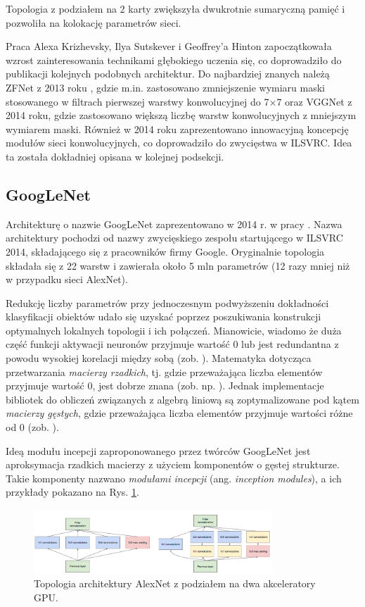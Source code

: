 Topologia z podziałem na 2 karty zwiększyła dwukrotnie sumaryczną pamięć i pozwoliła na kolokację parametrów sieci.

Praca Alexa Krizhevsky, Ilya Sutskever i Geoffrey'a Hinton zapoczątkowała wzrost zainteresowania technikami głębokiego uczenia się, co doprowadziło do publikacji kolejnych podobnych architektur. Do najbardziej znanych należą ZFNet z 2013 roku \cite{ZFNet}, gdzie m.in. zastosowano zmniejszenie wymiaru maski stosowanego w filtrach pierwszej warstwy konwolucyjnej do 7$\times$7 oraz VGGNet \cite{VGGNet} z 2014 roku, gdzie zastosowano większą liczbę warstw konwolucyjnych z mniejszym wymiarem maski. Również w 2014 roku zaprezentowano innowacyjną koncepcję modułów sieci konwolucyjnych, co doprowadziło do zwycięstwa w ILSVRC. Idea ta została dokładniej opisana w kolejnej podsekcji.

\subsection{GoogLeNet}

Architekturę o nazwie GoogLeNet zaprezentowano w 2014 r. w pracy \cite{GoogleNet}. Nazwa architektury pochodzi od nazwy zwycięskiego zespołu startującego w ILSVRC 2014, składającego się z pracowników firmy Google. Oryginalnie topologia składała się z 22 warstw i zawierała około 5 mln parametrów (12 razy mniej niż w przypadku sieci AlexNet). 

Redukcję liczby parametrów przy jednoczesnym podwyższeniu dokładności klasyfikacji obiektów udało się uzyskać poprzez poszukiwania konstrukcji optymalnych lokalnych topologii i ich połączeń. Mianowicie, wiadomo że duża część funkcji aktywacji neuronów przyjmuje wartość 0 lub jest redundantna z powodu wysokiej korelacji między sobą (zob. \cite{DBLP:journals/corr/AroraBGM13}). Matematyka dotycząca przetwarzania \textit{macierzy rzadkich}, tj. gdzie przeważająca liczba elementów przyjmuje wartość 0, jest dobrze znana (zob. np. \cite{Umit2010}). Jednak implementacje bibliotek do obliczeń związanych z algebrą liniową są zoptymalizowane pod kątem \textit{macierzy gęstych}, gdzie przeważająca liczba elementów przyjmuje wartości różne od 0 (zob. \cite{Song:2014:SUM:2597652.2597670, Krizhevsky2012}). 

Ideą modułu incepcji zaproponowanego przez twórców GoogLeNet jest aproksymacja rzadkich macierzy z użyciem komponentów o gęstej strukturze. Takie komponenty nazwano \textit{modułami incepcji} (ang. \textit{inception modules}), a ich przykłady pokazano na Rys. \ref{GoogleNetInceptionModules}. 
\begin{figure}[h!]
	\centering
	\includegraphics[width=0.8\textwidth]{figures/InceptionModules.png}
	\caption{Topologia architektury AlexNet z podziałem na dwa akceleratory GPU.}
	\label{GoogleNetInceptionModules}
\end{figure}

